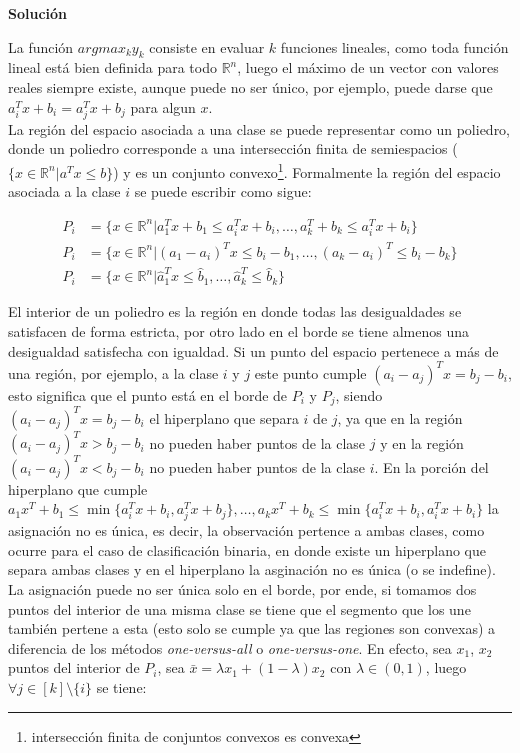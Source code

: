 \documentclass[11pt,letterpaper]{article}
\begin{document}
\textbf{Solución}

 La función $argmax_{k}y_{k}$ consiste en evaluar $k$ funciones lineales, como toda función lineal está bien definida para todo $\mathbb{R}^{n}$, luego el máximo de un vector con valores reales siempre existe, aunque puede no ser único, por ejemplo, puede darse que $a_{i}^{T}x+b_{i}= a_{j}^{T}x+b_{j}$ para algun $x$. \\

La región del espacio asociada a una clase se puede representar como un poliedro, donde un poliedro corresponde a una intersección finita de semiespacios ($\{x\in \mathbb{R}^{n}|a^{T}x\leq b\}$) y es un conjunto convexo\footnote{intersección finita de conjuntos convexos es convexa}. Formalmente la región del espacio asociada a la clase $i$ se puede escribir como sigue:

\begin{align*}
    P_{i} &= \{x\in \mathbb{R}^{n}| a_{1}^{T}x+b_{1}\leq a_{i}^{T}x+b_{i}, \ldots, a_{k}^{T}+b_{k}\leq a_{i}^{T}x+b_{i} \}\\
    P_{i} &= \{x\in \mathbb{R}^{n}| (a_{1}-a_{i})^{T}x\leq b_{i}-b_{1}, \ldots, (a_{k}-a_{i})^{T}\leq b_{i}-b_{k} \}\\
    P_{i} &= \{x\in \mathbb{R}^{n}| \hat{a}_{1}^{T}x\leq \hat{b}_{1}, \ldots, \hat{a}_{k}^{T}\leq \hat{b}_{k}\}
\end{align*}

 El interior de un poliedro es la región en donde todas las desigualdades se satisfacen de forma estricta, por otro lado en el borde se tiene almenos una desigualdad satisfecha con igualdad. Si un punto del espacio pertenece a más de una región, por ejemplo, a la clase $i$ y $j$ este punto cumple $(a_{i}-a_{j})^{T}x=b_{j}-b_{i}$, esto significa que el punto está en el borde de $P_{i}$ y $P_{j}$, siendo $(a_{i}-a_{j})^{T}x=b_{j}-b_{i}$ el hiperplano que separa $i$ de $j$, ya que en la región $(a_{i}-a_{j})^{T}x>b_{j}-b_{i}$ no pueden haber puntos de la clase $j$ y en la región $(a_{i}-a_{j})^{T}x<b_{j}-b_{i}$ no pueden haber puntos de la clase $i$. En la porción del hiperplano que cumple $a_{1}x^{T}+b_{1}\leq \min\{a_{i}^{T}x+b_{i},  a_{j}^{T}x+b_{j}\}, \ldots, a_{k}x^{T}+b_{k}\leq \min\{a_{i}^{T}x+b_{i},  a_{i}^{T}x+b_{i}\}$ la asignación no es única, es decir, la observación pertence a ambas clases, como ocurre para el caso de clasificación binaria, en donde existe un hiperplano que separa ambas clases y en el hiperplano la asginación no es única (o se indefine). La asignación puede no ser única solo en el borde, por ende, si tomamos dos puntos del interior de una misma clase se tiene que el segmento que los une también pertene a esta (esto solo se cumple ya que las regiones son convexas) a diferencia de los métodos \textit{one-versus-all} o \textit{one-versus-one}. En efecto, sea $x_{1}$, $x_{2}$ puntos del interior de $P_{i}$, sea $\bar{x} = \lambda x_{1}+(1-\lambda)x_{2}$ con $\lambda \in (0,1)$, luego $\forall j \in [k]\setminus\{i\}$ se tiene:
\end{document}
